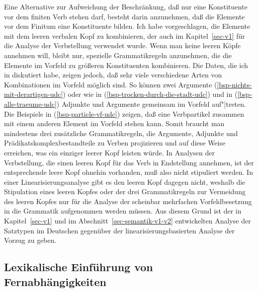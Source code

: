 \noindent
Eine Alternative zur Aufweichung der Beschränkung, daß nur eine Konstituente vor dem finiten
Verb stehen darf, besteht darin anzunehmen, daß die Elemente vor dem Finitum eine Konstituente
bilden. Ich habe vorgeschlagen, die Elemente mit dem leeren verbalen Kopf zu kombinieren, der
auch im Kapitel~\ref{sec-v1} für die Analyse der Verbstellung verwendet wurde. Wenn man keine
leeren Köpfe annehmen will, bleibt nur, spezielle Grammatikregeln anzunehmen, die die Elemente
im Vorfeld zu größeren Konstituenten kombinieren. Die Daten, die ich in 
diskutiert habe, zeigen jedoch, daß sehr viele verschiedene Arten von Kombinationen
im Vorfeld möglich sind. So können zwei Argumente (\ref{bsp-nichts-mit-derartigen-udc}) oder wie in
(\ref{bsp-trocken-durch-die-stadt-udc}) und in (\ref{bsp-alle-traeume-udc}) Adjunkte und Argumente
gemeinsam im Vorfeld auf"|treten. Die Beispiele in (\ref{bsp-particle-vf-udc}) zeigen, daß eine
Verbpartikel zusammen mit einem anderen Element im Vorfeld stehen kann. Somit braucht man mindestens
drei zusätzliche Grammatikregeln, die Argumente, Adjunkte und Prädikatskomplexbestandteile zu Verben projizieren und auf diese
Weise erreichen, was ein einziger leerer Kopf leisten würde. In Analysen der Verbstellung,
die einen leeren Kopf für das Verb in Endstellung annehmen, ist der entsprechende leere Kopf
ohnehin vorhanden, muß also nicht stipuliert werden. In einer Linearisierungsanalyse gibt es
den leeren Kopf dagegen nicht, weshalb die Stipulation eines leeren Kopfes oder der drei Grammatikregeln
zur Vermeidung des leeren Kopfes nur für die Analyse der scheinbar mehrfachen Vorfeldbesetzung
in die Grammatik aufgenommen werden müssen. Aus diesem Grund ist der in Kapitel~\ref{sec-v1}
und im Abschnitt~\ref{sec-semantik-v1-v2} entwickelten Analyse der Satztypen im Deutschen
gegenüber der linearisierungsbasierten Analyse der Vorzug zu geben.%


\subsection{Lexikalische Einführung von Fernabhängigkeiten}
\label{sec-lex-intro-udc}

